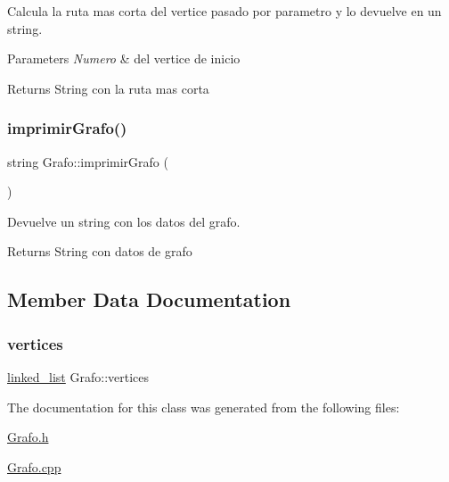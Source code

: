 Calcula la ruta mas corta del vertice pasado por parametro y lo devuelve en un string. 


\begin{DoxyParams}{Parameters}
{\em Numero} & del vertice de inicio \\
\hline
\end{DoxyParams}
\begin{DoxyReturn}{Returns}
String con la ruta mas corta 
\end{DoxyReturn}
\mbox{\label{classGrafo_a393cda605e6668dd60b8263fbed5a979}} 
\subsubsection{\texorpdfstring{imprimir\+Grafo()}{imprimirGrafo()}}
{\footnotesize\ttfamily string Grafo\+::imprimir\+Grafo (\begin{DoxyParamCaption}{ }\end{DoxyParamCaption})}



Devuelve un string con los datos del grafo. 

\begin{DoxyReturn}{Returns}
String con datos de grafo 
\end{DoxyReturn}


\subsection{Member Data Documentation}
\mbox{\label{classGrafo_a616d168e63215c3c0051dc7504edeff1}} 
\subsubsection{\texorpdfstring{vertices}{vertices}}
{\footnotesize\ttfamily \hyperlink{classlinked__list}{linked\+\_\+list} Grafo\+::vertices}



The documentation for this class was generated from the following files\+:\begin{DoxyCompactItemize}
\item 
\hyperlink{Grafo_8h}{Grafo.\+h}\item 
\hyperlink{Grafo_8cpp}{Grafo.\+cpp}\end{DoxyCompactItemize}

